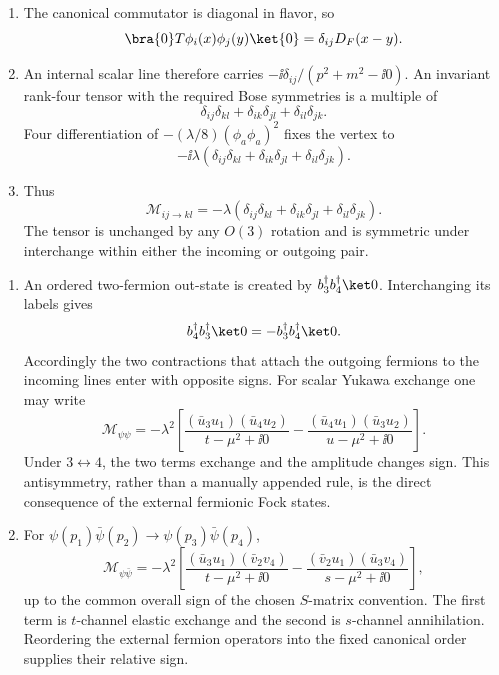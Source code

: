 \begin{enumerate}
\begin{enumerate}
\item
The canonical commutator is diagonal in flavor, so
\[
 \bra{0}T\phi_i(x)\phi_j(y)\ket{0}=\delta_{ij}D_F(x-y).
\]
\item
An internal scalar line therefore carries
\(-\ii\delta_{ij}/(p^2+m^2-\ii0)\).
An invariant rank-four tensor with the required Bose symmetries is a
multiple of
\[
 \delta_{ij}\delta_{kl}+\delta_{ik}\delta_{jl}
 +\delta_{il}\delta_{jk}.
\]
Four differentiation of
\(-(\lambda/8)(\phi_a\phi_a)^2\) fixes the vertex to
\[
 -\ii\lambda\left(
 \delta_{ij}\delta_{kl}+\delta_{ik}\delta_{jl}
 +\delta_{il}\delta_{jk}\right).
\]
\item
Thus
\[
 \mathcal M_{ij\to kl}
 =-\lambda\left(
 \delta_{ij}\delta_{kl}+\delta_{ik}\delta_{jl}
 +\delta_{il}\delta_{jk}\right).
\]
The tensor is unchanged by any \(O(3)\) rotation and is symmetric under
interchange within either the incoming or outgoing pair.
\end{enumerate}

\begin{enumerate}
\item
An ordered two-fermion out-state is created by
\(b^\dagger_3b^\dagger_4\ket0\).  Interchanging its labels gives
\[
 b^\dagger_4b^\dagger_3\ket0
 =-b^\dagger_3b^\dagger_4\ket0.
\]
Accordingly the two contractions that attach the outgoing fermions to
the incoming lines enter with opposite signs.  For scalar Yukawa
exchange one may write
\[
 \mathcal M_{\psi\psi}=-\lambda^2\left[
 \frac{(\bar u_3u_1)(\bar u_4u_2)}{t-\mu^2+\ii0}
 -\frac{(\bar u_4u_1)(\bar u_3u_2)}{u-\mu^2+\ii0}\right].
\]
Under \(3\leftrightarrow4\), the two terms exchange and the amplitude
changes sign.  This antisymmetry, rather than a manually appended rule,
is the direct consequence of the external fermionic Fock states.
\item
For \(\psi(p_1)\bar\psi(p_2)\to\psi(p_3)\bar\psi(p_4)\),
\[
 \mathcal M_{\psi\bar\psi}=-\lambda^2\left[
 \frac{(\bar u_3u_1)(\bar v_2v_4)}{t-\mu^2+\ii0}
 -\frac{(\bar v_2u_1)(\bar u_3v_4)}{s-\mu^2+\ii0}\right],
\]
up to the common overall sign of the chosen \(S\)-matrix convention.
The first term is \(t\)-channel elastic exchange and the second is
\(s\)-channel annihilation.  Reordering the external fermion operators
into the fixed canonical order supplies their relative sign.
\end{enumerate}


\end{enumerate}
